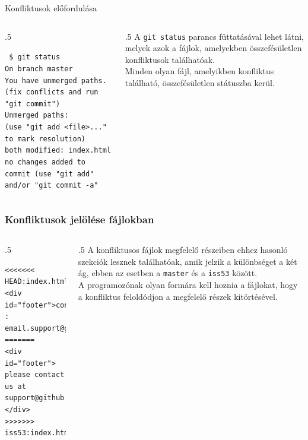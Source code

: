 \documentclass[english, aspectratio=169]{beamer}
\begin{document}
\begin{frame}{Konfliktusok előfordulása}
\begin{columns}
\begin{column}{.5\textwidth}
\begin{footnotesize}
\begin{block}{}
\texttt{
\$ git status\\
On branch master\\
You have unmerged paths.\\
(fix conflicts and run "git commit")\\
Unmerged paths:\\
(use "git add <file>..." to mark resolution)\\
both modified: index.html\\
no changes added to commit (use "git add" and/or "git commit -a"\\}
\end{block}
\end{footnotesize}
\end{column}
\begin{column}{.5\textwidth}
A \texttt{git status} parancs füttatásával lehet látni, melyek azok a fájlok, amelyekben összefésületlen konfliktusok
találhatóak.\\
\vspace{0.2cm}
Minden olyan fájl, amelyikben konfliktus található, összefésületlen státuszba kerül.
\end{column}
\end{columns}
\end{frame}

\begin{frame}[fragile]\frametitle{Konfliktusok jelölése fájlokban}
\begin{columns}
\begin{column}{.5\textwidth}
\begin{footnotesize}
\begin{block}{}
\begin{verbatim}
<<<<<<< HEAD:index.html
<div id="footer">contact :
email.support@github.com</div>
=======
<div id="footer">
please contact us at support@github.com
</div>
>>>>>>> iss53:index.html
\end{verbatim}
\end{block}
\end{footnotesize}
\end{column}
\begin{column}{.5\textwidth}
A konfliktusos fájlok megfelelő részeiben ehhez hasonló szekciók lesznek találhatóak, amik jelzik a különbséget a két ág, ebben az esetben a \texttt{master} és a \texttt{iss53} között.\\
\vspace{0.2cm}
A programozónak olyan formára kell hoznia a fájlokat, hogy a konfliktus feloldódjon a megfelelő részek kitörtésével.
\end{column}
\end{columns}
\end{frame}
\end{document}
